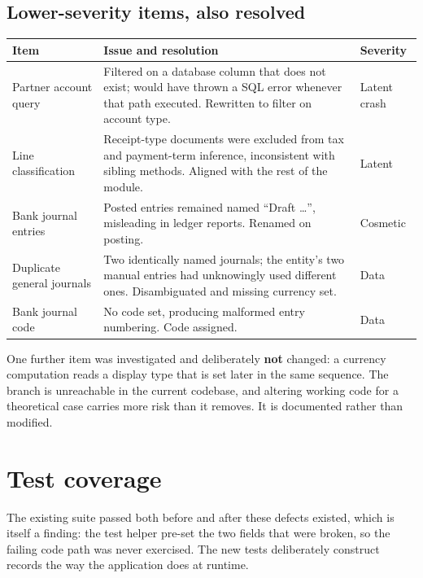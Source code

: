 \documentclass[11pt,a4paper]{article}
\begin{document}
\subsection{Lower-severity items, also resolved}

\begin{center}
\small
\begin{tabularx}{\textwidth}{@{}l X l@{}}
\toprule
\textbf{Item} & \textbf{Issue and resolution} & \textbf{Severity}\\
\midrule
Partner account query & Filtered on a database column that does not exist; would have thrown a SQL
  error whenever that path executed. Rewritten to filter on account type. & Latent crash\\
\addlinespace
Line classification & Receipt-type documents were excluded from tax and payment-term inference,
  inconsistent with sibling methods. Aligned with the rest of the module. & Latent\\
\addlinespace
Bank journal entries & Posted entries remained named ``Draft \ldots'', misleading in ledger reports.
  Renamed on posting. & Cosmetic\\
\addlinespace
Duplicate general journals & Two identically named journals; the entity's two manual entries had
  unknowingly used different ones. Disambiguated and missing currency set. & Data\\
\addlinespace
Bank journal code & No code set, producing malformed entry numbering. Code assigned. & Data\\
\bottomrule
\end{tabularx}
\end{center}

\vspace{6pt}
One further item was investigated and deliberately \textbf{not} changed: a currency computation reads
a display type that is set later in the same sequence. The branch is unreachable in the current
codebase, and altering working code for a theoretical case carries more risk than it removes. It is
documented rather than modified.

\section{Test coverage}

The existing suite passed both before and after these defects existed, which is itself a finding: the
test helper pre-set the two fields that were broken, so the failing code path was never exercised. The
new tests deliberately construct records the way the application does at runtime.
\end{document}
